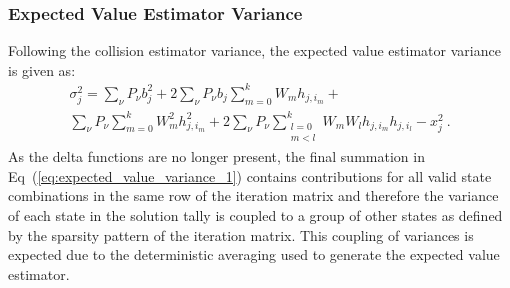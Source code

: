 \subsubsection{Expected Value Estimator Variance}
\label{subsubsec:expected_value_estimator_variance}
Following the collision estimator variance, the expected value
estimator variance is given as:
\begin{multline}
  \sigma_j^2 = \sum_{\nu} P_{\nu} b_j^2 + 2 \sum_{\nu} P_{\nu} b_j
  \sum_{m=0}^k W_{m} h_{j,i_m} +\\ \sum_{\nu} P_{\nu} \sum_{m=0}^k
  W_{m}^2 h_{j,i_m}^2 + 2 \sum_{\nu} P_{\nu} \sum_{\substack{ l=0
      \\ m<l}}^k W_m W_l h_{j,i_m} h_{j,i_l} - x_j^2\:.
  \label{eq:expected_value_variance_1}
\end{multline}
As the delta functions are no longer present, the final summation in
Eq~(\ref{eq:expected_value_variance_1}) contains contributions for all
valid state combinations in the same row of the iteration matrix and
therefore the variance of each state in the solution tally is coupled
to a group of other states as defined by the sparsity pattern of the
iteration matrix. This coupling of variances is expected due to the
deterministic averaging used to generate the expected value estimator.


